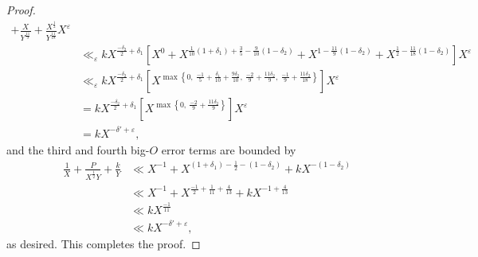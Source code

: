 \documentclass[12pt,letterpaper,reqno]{amsart}
\theoremstyle{plain}
\theoremstyle{definition}
\numberwithin{equation}{section}
\numberwithin{figure}{section}
\numberwithin{table}{section}
\newcommand{\lrb}[1]{\!\left[#1\right]}
\newcommand{\lrcb}[1]{\!\left\{#1\right\}}
\begin{document}
\begin{proof}
\begin{align}
{        +
        \frac{X}{Y^\frac{11}{9}}
        +
        \frac{X^\frac{1}{2}}{Y^\frac{11}{18}}
    }
    X^\varepsilon \\
    &\ll_\varepsilon  
    k X^{\frac{-\delta_2}{2}  + \delta_1}
    \lrb{
        X^0 + 
        X^{\frac{1}{10}(1+\delta_1) + \frac{3}{5} - \frac{9}{10}(1-\delta_2)} +
        X^{1-\frac{11}{9}(1-\delta_2)}
        +
        X^{\frac{1}{2} - \frac{11}{18} (1-\delta_2)}
    } X^{\varepsilon} \\
    &\ll_\varepsilon  
    k X^{\frac{-\delta_2}{2}  + \delta_1}
    \lrb{
        X^{\max \lrcb{
            0,\ \frac{-1}{5} + \frac{\delta_1}{10} + \frac{9\delta_2}{10},\ 
            \frac{-2}{9} + \frac{11\delta_2}{9},\ 
            \frac{-1}{9} + \frac{11\delta_2}{18}
        }}
    } X^{\varepsilon} \\
    &=
    k X^{\frac{-\delta_2}{2}  + \delta_1}
    \lrb{
        X^{\max \lrcb{
            0,\ 
            \frac{-2}{9} + \frac{11\delta_2}{9}
        }}
    } X^{\varepsilon} \\
    &= k X^{-\delta'+\varepsilon},
\end{align}
and the third and fourth big-$O$ error terms are bounded by
\begin{align}
    \frac{1}{X} + \frac{P}{X^\frac{1}{2} Y} + \frac{k}{Y} &\ll X^{-1} + X^{(1+\delta_1) - \frac{1}{2} - (1-\delta_2)} + kX^{-(1-\delta_2)} \\
    &\ll X^{-1} + X^{\frac{-1}{2}+\frac{1}{11}+\frac{4}{13}} + k X^{-1 + \frac{4}{13}}\\
    &\ll kX^{\frac{-1}{11}} \\
    &\ll k X^{-\delta'+\varepsilon}, \label{eqn:temp-third-and-fourth-big-O}
\end{align}
as desired. This completes the proof.
\end{proof}
\end{document}
